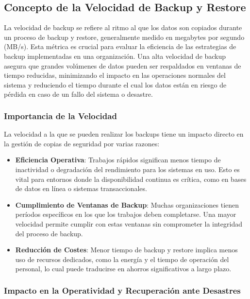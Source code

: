 \subsection{Concepto de la Velocidad de Backup y Restore}

La velocidad de backup se refiere al ritmo al que los datos son copiados durante un proceso de backup y restore, generalmente medido en megabytes por segundo (MB/s). Esta métrica es crucial para evaluar la eficiencia de las estrategias de backup implementadas en una organización. Una alta velocidad de backup asegura que grandes volúmenes de datos pueden ser respaldados en ventanas de tiempo reducidas, minimizando el impacto en las operaciones normales del sistema y reduciendo el tiempo durante el cual los datos están en riesgo de pérdida en caso de un fallo del sistema o desastre.

\subsubsection{Importancia de la Velocidad}

La velocidad a la que se pueden realizar los backups tiene un impacto directo en la gestión de copias de seguridad por varias razones:
\begin{itemize}
    \item \textbf{Eficiencia Operativa}: Trabajos rápidos significan menos tiempo de inactividad o degradación del rendimiento para los sistemas en uso. Esto es vital para entornos donde la disponibilidad continua es crítica, como en bases de datos en línea o sistemas transaccionales.
    \item \textbf{Cumplimiento de Ventanas de Backup}: Muchas organizaciones tienen períodos específicos en los que los trabajos deben completarse. Una mayor velocidad permite cumplir con estas ventanas sin comprometer la integridad del proceso de backup.
    \item \textbf{Reducción de Costes}: Menor tiempo de backup y restore implica menos uso de recursos dedicados, como la energía y el tiempo de operación del personal, lo cual puede traducirse en ahorros significativos a largo plazo.
\end{itemize}

\subsubsection{Impacto en la Operatividad y Recuperación ante Desastres}

